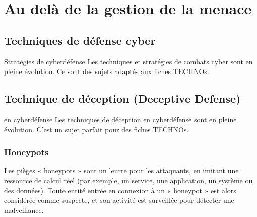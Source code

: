 
\section{Au delà de la gestion de la menace}

\subsection{Techniques de défense cyber}

\begin{warningbox}{Stratégies de cyberdéfense}
Les techniques et stratégies de combats cyber sont en pleine évolution. Ce sont des sujets adaptés aux fiches TECHNOs.
\end{warningbox}

\subsection{Technique de déception (Deceptive Defense)}

\begin{warningbox}{ en cyberdéfense}
Les techniques de déception en cyberdéfense sont en pleine évolution. C'est un sujet parfait pour des fiches TECHNOs.
\end{warningbox}

\subsubsection{Honeypots}

Les pièges « honeypots » sont un leurre pour les attaquants, en imitant une ressource de calcul réel (par exemple, un service, une application, un système ou des données). Toute entité entrée en connexion à un « honeypot » est alors considérée comme suspecte, et son activité est surveillée pour détecter une malveillance.


